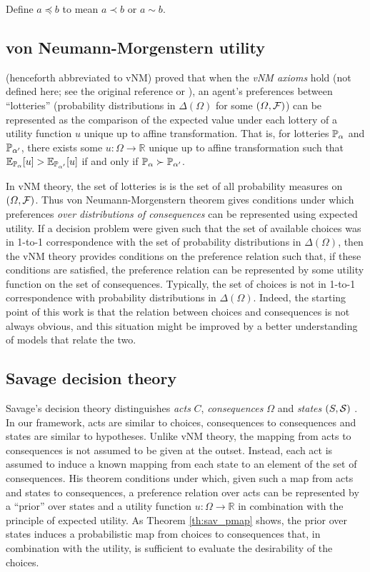 Define $a\preceq b$ to mean $a\prec b$ or $a \sim b$.

\subsection{von Neumann-Morgenstern utility}

\citet{von_neumann_theory_1944} (henceforth abbreviated to vNM) proved that when the \emph{vNM axioms} hold (not defined here; see the original reference or \citet{steele_decision_2020}), an agent's preferences between ``lotteries'' (probability distributions in $\Delta(\Omega)$ for some $(\Omega,\mathcal{F})$) can be represented as the comparison of the expected value under each lottery of a utility function $u$ unique up to affine transformation. That is, for lotteries $\mathbb{P}_\alpha$ and $\mathbb{P}_{\alpha'}$, there exists some $u:\Omega\to \mathbb{R}$ unique up to affine transformation such that $\mathbb{E}_{\mathbb{P}_\alpha}[u]> \mathbb{E}_{\mathbb{P}_{\alpha'}}[u]$ if and only if $\mathbb{P}_{\alpha} \succ \mathbb{P}_{\alpha'}$.

In vNM theory, the set of lotteries is is the set of all probability measures on $(\Omega,\mathcal{F})$. Thus von Neumann-Morgenstern theorem gives conditions under which preferences \emph{over distributions of consequences} can be represented using expected utility. If a decision problem were given such that the set of available choices was in 1-to-1 correspondence with the set of probability distributions in $\Delta(\Omega)$, then the vNM theory provides conditions on the preference relation such that, if these conditions are satisfied, the preference relation can be represented by some utility function on the set of consequences. Typically, the set of choices is not in 1-to-1 correspondence with probability distributions in $\Delta(\Omega)$. Indeed, the starting point of this work is that the relation between choices and consequences is not always obvious, and this situation might be improved by a better understanding of models that relate the two.

\subsection{Savage decision theory}

Savage's decision theory distinguishes \emph{acts} $C$, \emph{consequences} $\Omega$ and \emph{states} $(S,\mathcal{S})$ \citep{savage_foundations_1954}. In our framework, acts are similar to choices, consequences to consequences and states are similar to hypotheses. Unlike vNM theory, the mapping from acts to consequences is not assumed to be given at the outset. Instead, each act is assumed to induce a known mapping from each state to an element of the set of consequences. His theorem conditions under which, given such a map from acts and states to consequences, a preference relation over acts can be represented by a ``prior'' over states and a utility function $u:\Omega\to \mathbb{R}$ in combination with the principle of expected utility. As Theorem \ref{th:sav_pmap} shows, the prior over states induces a probabilistic map from choices to consequences that, in combination with the utility, is sufficient to evaluate the desirability of the choices.

